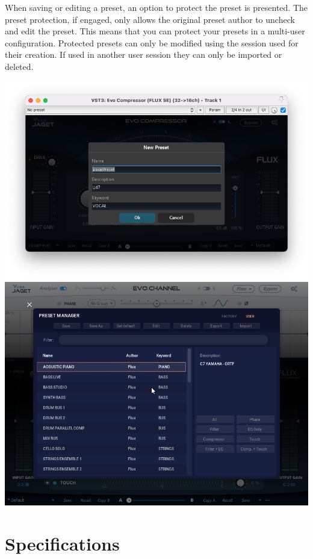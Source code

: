 \documentclass[
  letterpaper,
  DIV=11,
  numbers=noendperiod]{scrreport}
\begin{document}
When saving or editing a preset, an option to protect the preset is
presented. The preset protection, if engaged, only allows the original
preset author to uncheck and edit the preset. This means that you can
protect your presets in a multi-user configuration. Protected presets
can only be modified using the session used for their creation. If used
in another user session they can only be imported or deleted.

\includegraphics{include/evoComp_preset2.png}
\includegraphics{include/ManualEvoChannel-014.png}


\hypertarget{specifications}{%
\chapter{Specifications}\label{specifications}}
\end{document}
